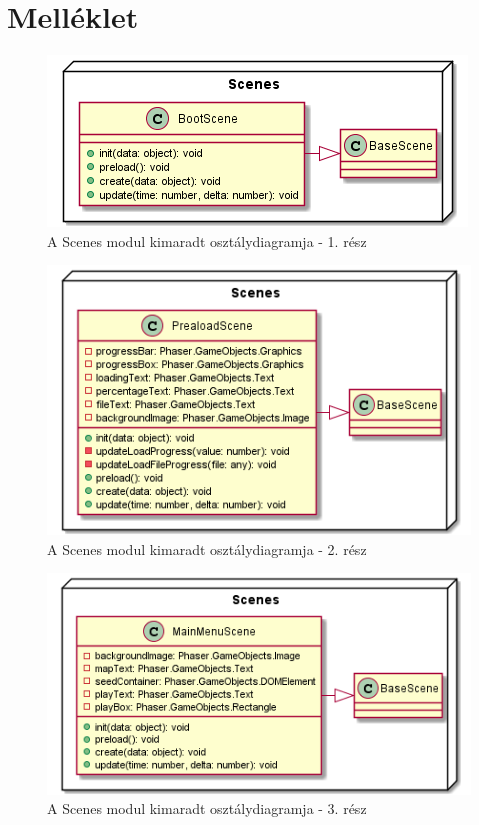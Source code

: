 \newpage

\section*{Melléklet}

\begin{figure}[h!]
	\centering
	\includegraphics[scale=0.75]{kepek/uml/scenes/scene-pt2.png}
	\caption{A Scenes modul kimaradt osztálydiagramja - 1. rész}
	\label{fig:uml:scene-pt2}
\end{figure}

\begin{figure}[h!]
	\centering
	\includegraphics[scale=0.75]{kepek/uml/scenes/scene-pt3.png}
	\caption{A Scenes modul kimaradt osztálydiagramja - 2. rész}
	\label{fig:uml:scene-pt3}
\end{figure}

\begin{figure}[h!]
	\centering
	\includegraphics[scale=0.75]{kepek/uml/scenes/scene-pt4.png}
	\caption{A Scenes modul kimaradt osztálydiagramja - 3. rész}
	\label{fig:uml:scene-pt4}
\end{figure}

